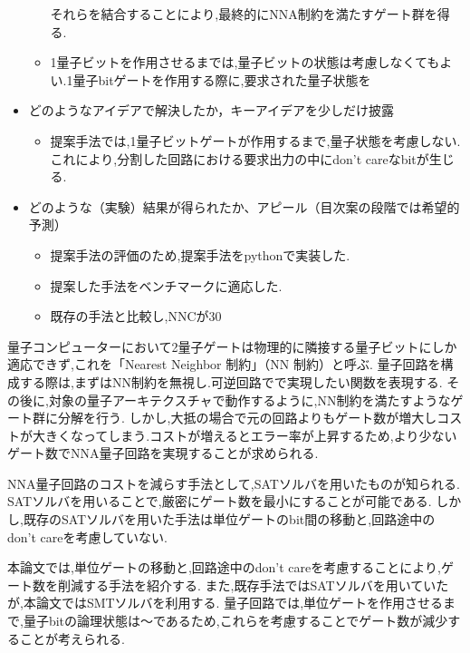 \documentclass[10pt]{jbook}
\begin{document}
\begin{itemize}
\begin{itemize}
      それらを結合することにより,最終的にNNA制約を満たすゲート群を得る.
      \item 1量子ビットを作用させるまでは,量子ビットの状態は考慮しなくてもよい.1量子bitゲートを作用する際に,要求された量子状態を
    \end{itemize}
  \item どのようなアイデアで解決したか，キーアイデアを少しだけ披露
    \begin{itemize}
      \item 提案手法では,1量子ビットゲートが作用するまで,量子状態を考慮しない.これにより,分割した回路における要求出力の中にdon't careなbitが生じる.
    \end{itemize}
  \item どのような（実験）結果が得られたか、アピール（目次案の段階では希望的予測）
  \begin{itemize}
    \item 提案手法の評価のため,提案手法をpythonで実装した.
    \item 提案した手法をベンチマークに適応した.
    \item 既存の手法と比較し,NNCが30%
  \end{itemize}
 \end{itemize}




 


量子コンピューターにおいて2量子ゲートは物理的に隣接する量子ビットにしか適応できず,これを「Nearest Neighbor 制約」（NN 制約）と呼ぶ.
量子回路を構成する際は,まずはNN制約を無視し.可逆回路でで実現したい関数を表現する.
その後に,対象の量子アーキテクスチャで動作するように,NN制約を満たすようなゲート群に分解を行う.
しかし,大抵の場合で元の回路よりもゲート数が増大しコストが大きくなってしまう.コストが増えるとエラー率が上昇するため,より少ないゲート数でNNA量子回路を実現することが求められる.






NNA量子回路のコストを減らす手法として,SATソルバを用いたものが知られる.
SATソルバを用いることで,厳密にゲート数を最小にすることが可能である.
しかし,既存のSATソルバを用いた手法は単位ゲートのbit間の移動と,回路途中のdon’t careを考慮していない.

 
本論文では,単位ゲートの移動と,回路途中のdon’t careを考慮することにより,ゲート数を削減する手法を紹介する.
また,既存手法ではSATソルバを用いていたが,本論文ではSMTソルバを利用する.
量子回路では,単位ゲートを作用させるまで,量子bitの論理状態は～であるため,これらを考慮することでゲート数が減少することが考えられる.
\end{document}
